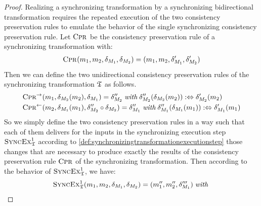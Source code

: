 \begin{proof}
    Realizing a synchronizing transformation by a synchronizing bidirectional transformation requires the repeated execution of the two consistency preservation rules to emulate the behavior of the single 
    synchronizing consistency preservation rule.
    Let $\textsc{Cpr}_{}$ be the consistency preservation rule of a synchronizing transformation with:
    \begin{align*}
        \textsc{Cpr}_{}(m_{1},m_{2},\delta_{M_{1}},\delta_{M_{2}}) = (m_{1},m_{2},\delta_{M_{1}}',\delta_{M_{2}}')
    \end{align*}
    Then we can define the two unidirectional consistency preservation rules of the synchronizing transformation $\mathfrak{T}$ as follows.
    \begin{align*}
        & 
        \textsc{Cpr}_{}^{\rightarrow}(m_{1},\delta_{M_{2}}(m_{2}),\delta_{M_{1}}) = \delta_{M_{2}}'' \; \textit{with} \; \delta_{M_{2}}''(\delta_{M_{2}}(m_{2})) :\Leftrightarrow \delta_{M_{2}}'(m_{2}) \\
        &
        \textsc{Cpr}_{}^{\leftarrow}(m_{2},\delta_{M_{1}}(m_{1}),\delta_{M_{2}}'' \circ \delta_{M_{2}}) = \delta_{M_{1}}'' \; \textit{with} \; \delta_{M_{1}}''(\delta_{M_{1}}(m_{1})) :\Leftrightarrow \delta_{M_{1}}'(m_{1})
    \end{align*}
    So we simply define the two consistency preservation rules in a way such that each of them delivers for the inputs in the synchronizing execution step $\textsc{SyncEx}_{\mathfrak{T}}^1$ according to \autoref{def:synchronizingtransformationexecutionstep} those changes that are necessary to produce exactly the results of the consistency preservation rule $\textsc{Cpr}_{}$ of the synchronizing transformation.
    Then according to the behavior of $\textsc{SyncEx}_{\mathfrak{T}}^1$, we have:
    \begin{align*}
        &
        \function{SyncEx}_{\transformation{T}}^1(\model{m}{1},\model{m}{2},\change{\metamodel{M}{1}},\change{\metamodel{M}{2}}) = (\model{m}{1}'', \model{m}{2}'', \change{\metamodel{M}{1}}''') \mathtext{with} \\

\end{align*}
\end{proof}
